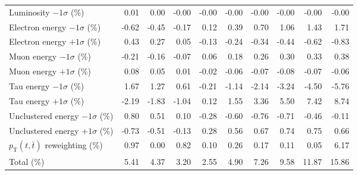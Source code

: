 \begin{table}[htbp]
{\begin{tabular}{lrrrrrrrrr}
Luminosity $-1\sigma$ (\%) & 0.01 & 0.00 & -0.00 & -0.00 & -0.00 & -0.00 & -0.00 & -0.00 & -0.00 \\ 
Electron energy $-1\sigma$ (\%) & -0.62 & -0.45 & -0.17 & 0.12 & 0.39 & 0.70 & 1.06 & 1.43 & 1.71 \\ 
Electron energy $+1\sigma$ (\%) & 0.43 & 0.27 & 0.05 & -0.13 & -0.24 & -0.34 & -0.44 & -0.62 & -0.83 \\ 
Muon energy $-1\sigma$ (\%) & -0.21 & -0.16 & -0.07 & 0.06 & 0.18 & 0.26 & 0.30 & 0.33 & 0.38 \\ 
Muon energy $+1\sigma$ (\%) & 0.08 & 0.05 & 0.01 & -0.02 & -0.06 & -0.07 & -0.08 & -0.07 & -0.06 \\ 
Tau energy $-1\sigma$ (\%) & 1.67 & 1.27 & 0.61 & -0.21 & -1.14 & -2.14 & -3.24 & -4.50 & -5.76 \\ 
Tau energy $+1\sigma$ (\%) & -2.19 & -1.83 & -1.04 & 0.12 & 1.55 & 3.36 & 5.50 & 7.42 & 8.74 \\ 
Unclustered energy $-1\sigma$ (\%) & 0.80 & 0.51 & 0.10 & -0.28 & -0.60 & -0.76 & -0.71 & -0.46 & -0.11 \\ 
Unclustered energy $+1\sigma$ (\%) & -0.73 & -0.51 & -0.13 & 0.28 & 0.56 & 0.67 & 0.74 & 0.75 & 0.66 \\ 
$p_\mathrm{T}(t,\bar{t})$ reweighting (\%) & 0.97 & 0.00 & 0.82 & 0.10 & 0.26 & 0.17 & 0.11 & 0.05 & 6.17 \\ 
\hline 
Total (\%) & 5.41  & 4.37  & 3.20  & 2.55  & 4.90  & 7.26  & 9.58  & 11.87  & 15.86 \\ 
\hline 
\end{tabular}
}
\end{table}
